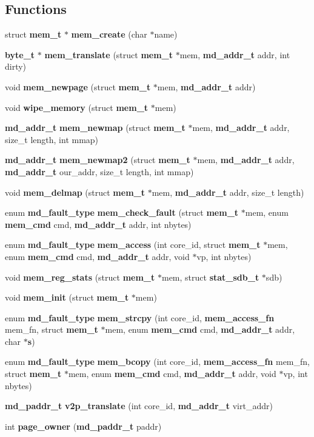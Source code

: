 \subsection*{Functions}
\begin{CompactItemize}
\item 
struct {\bf mem\_\-t} $\ast$ {\bf mem\_\-create} (char $\ast$name)
\item 
{\bf byte\_\-t} $\ast$ {\bf mem\_\-translate} (struct {\bf mem\_\-t} $\ast$mem, {\bf md\_\-addr\_\-t} addr, int dirty)
\item 
void {\bf mem\_\-newpage} (struct {\bf mem\_\-t} $\ast$mem, {\bf md\_\-addr\_\-t} addr)
\item 
void {\bf wipe\_\-memory} (struct {\bf mem\_\-t} $\ast$mem)
\item 
{\bf md\_\-addr\_\-t} {\bf mem\_\-newmap} (struct {\bf mem\_\-t} $\ast$mem, {\bf md\_\-addr\_\-t} addr, size\_\-t length, int mmap)
\item 
{\bf md\_\-addr\_\-t} {\bf mem\_\-newmap2} (struct {\bf mem\_\-t} $\ast$mem, {\bf md\_\-addr\_\-t} addr, {\bf md\_\-addr\_\-t} our\_\-addr, size\_\-t length, int mmap)
\item 
void {\bf mem\_\-delmap} (struct {\bf mem\_\-t} $\ast$mem, {\bf md\_\-addr\_\-t} addr, size\_\-t length)
\item 
enum {\bf md\_\-fault\_\-type} {\bf mem\_\-check\_\-fault} (struct {\bf mem\_\-t} $\ast$mem, enum {\bf mem\_\-cmd} cmd, {\bf md\_\-addr\_\-t} addr, int nbytes)
\item 
enum {\bf md\_\-fault\_\-type} {\bf mem\_\-access} (int core\_\-id, struct {\bf mem\_\-t} $\ast$mem, enum {\bf mem\_\-cmd} cmd, {\bf md\_\-addr\_\-t} addr, void $\ast$vp, int nbytes)
\item 
void {\bf mem\_\-reg\_\-stats} (struct {\bf mem\_\-t} $\ast$mem, struct {\bf stat\_\-sdb\_\-t} $\ast$sdb)
\item 
void {\bf mem\_\-init} (struct {\bf mem\_\-t} $\ast$mem)
\item 
enum {\bf md\_\-fault\_\-type} {\bf mem\_\-strcpy} (int core\_\-id, {\bf mem\_\-access\_\-fn} mem\_\-fn, struct {\bf mem\_\-t} $\ast$mem, enum {\bf mem\_\-cmd} cmd, {\bf md\_\-addr\_\-t} addr, char $\ast${\bf s})
\item 
enum {\bf md\_\-fault\_\-type} {\bf mem\_\-bcopy} (int core\_\-id, {\bf mem\_\-access\_\-fn} mem\_\-fn, struct {\bf mem\_\-t} $\ast$mem, enum {\bf mem\_\-cmd} cmd, {\bf md\_\-addr\_\-t} addr, void $\ast$vp, int nbytes)
\item 
{\bf md\_\-paddr\_\-t} {\bf v2p\_\-translate} (int core\_\-id, {\bf md\_\-addr\_\-t} virt\_\-addr)
\item 
int {\bf page\_\-owner} ({\bf md\_\-paddr\_\-t} paddr)
\end{CompactItemize}
